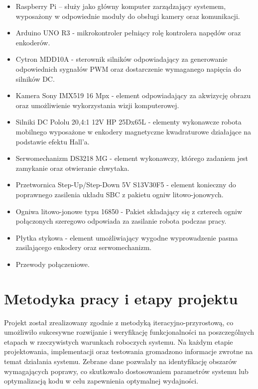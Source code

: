 \begin{itemize}
    \item Raspberry Pi – służy jako główny komputer zarządzający systemem, wyposażony w odpowiednie moduły do obsługi kamery oraz komunikacji.
    \item Arduino UNO R3 - mikrokontroler pełniący rolę kontrolera napędów oraz enkoderów.
    \item Cytron MDD10A - sterownik silników odpowiadający za generowanie odpowiednich sygnałów PWM oraz dostarczenie wymaganego napięcia do silników DC.
    \item Kamera Sony IMX519 16 Mpx - element odpowiadający za akwizycję obrazu oraz umożliwienie wykorzystania wizji komputerowej. 
    \item Silniki DC Pololu 20,4:1 12V HP 25Dx65L - elementy wykonawcze robota mobilnego wyposażone w enkodery magnetyczne kwadraturowe działające na podstawie efektu Hall'a.
    \item Serwomechanizm DS3218 MG - element wykonawczy, którego zadaniem jest zamykanie oraz otwieranie chwytaka.
    \item Przetwornica Step-Up/Step-Down 5V S13V30F5 - element konieczny do poprawnego zasilenia układu SBC z pakietu ogniw litowo-jonowych.
    \item Ogniwa litowo-jonowe typu 16850 - Pakiet składający się z czterech ogniw połączonych szeregowo odpowiada za zasilanie robota podczas pracy. 
    \item Płytka stykowa - element umożliwiający wygodne wyprowadzenie pasma zasilającego enkodery oraz serwomechanizm. 
    \item Przewody połączeniowe. 
    
\end{itemize}

\section{Metodyka pracy i etapy projektu}
Projekt został zrealizowany zgodnie z metodyką iteracyjno-przyrostową, co umożliwiło sukcesywne rozwijanie i weryfikację funkcjonalności na poszczególnych etapach w rzeczywistych warunkach roboczych systemu. Na każdym etapie projektowania, implementacji oraz testowania gromadzono informacje zwrotne na temat działania systemu. Zebrane dane pozwalały na identyfikację obszarów wymagających poprawy, co skutkowało dostosowaniem parametrów systemu lub optymalizacją kodu w celu zapewnienia optymalnej wydajności.

